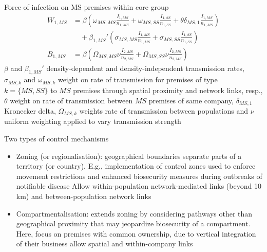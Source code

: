 \documentclass[aspectratio=43]{beamer}
\begin{document}
\begin{frame}{Force of infection on MS premises within core group}
	\begin{align*}
		W_{1,MS} &= \beta\left(
			\omega_{MS,MS}\frac{I_{1,MS}}{n_{1,MS}}+
			\omega_{MS,SS}\frac{I_{1,SS}}{n_{1,SS}}
			+\theta\delta_{MS,1}\frac{I_{1,MS}}{n_{1,MS}}
		\right) \\
		&\quad 
		+\beta_{1,MS}'\left(
			\sigma_{MS,MS}\frac{I_{1,MS}}{n_{1,MS}}+
			\sigma_{MS,SS}\frac{I_{1,SS}}{n_{1,SS}}
		\right) \\
		B_{1,MS} &= \beta\left(\Omega_{MS,MS}\nu\frac{I_{2,MS}}{n_{2,MS}}
		+\Omega_{MS,SS}\nu\frac{I_{2,MS}}{n_{2,MS}}\right)
	\end{align*}
	\vfill
	$\beta$ and $\beta_{1,MS}'$ density-dependent and density-independent transmission rates, $\sigma_{MS,k}$ and $\omega_{MS,k}$ weight on rate of transmission for premises of type $k=\{MS,SS\}$ to $MS$ premises through spatial proximity and network links, resp., $\theta$ weight on rate of transmission between $MS$ premises of same company, $\delta_{MS,1}$ Kronecker delta, $\Omega_{MS,k}$ weights rate of transmission between populations and $\nu$ uniform weighting applied to vary transmission strength
\end{frame}
\begin{frame}{Two types of control mechanisms}
	\begin{itemize}
		\item Zoning (or regionalisation): geographical boundaries separate
		parts of a territory (or country). 
		E.g., implementation of control zones used to enforce movement restrictions and enhanced biosecurity measures during outbreaks of notifiable disease
		\newline
		Allow within-population network-mediated links (beyond 10 km) and between-population network links
		\vfill
		\item Compartmentalisation: extends zoning by considering pathways other than geographical proximity that may jeopardize biosecurity of a compartment. Here, focus on premises with common ownership, due to vertical integration of their business
		\newline
		allow spatial and within-company links
	\end{itemize}
\end{frame}
\end{document}

